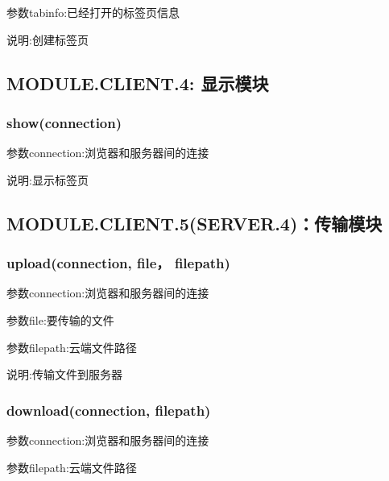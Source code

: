 参数tabinfo:已经打开的标签页信息

说明:创建标签页
\subsection{MODULE.CLIENT.4: 显示模块}

\subsubsection{show(connection)}
参数connection:浏览器和服务器间的连接

说明:显示标签页
\subsection{MODULE.CLIENT.5(SERVER.4)：传输模块}
\subsubsection{upload(connection, file， filepath)}
参数connection:浏览器和服务器间的连接

参数file:要传输的文件

参数filepath:云端文件路径

说明:传输文件到服务器
\subsubsection{download(connection, filepath)}

参数connection:浏览器和服务器间的连接

参数filepath:云端文件路径


